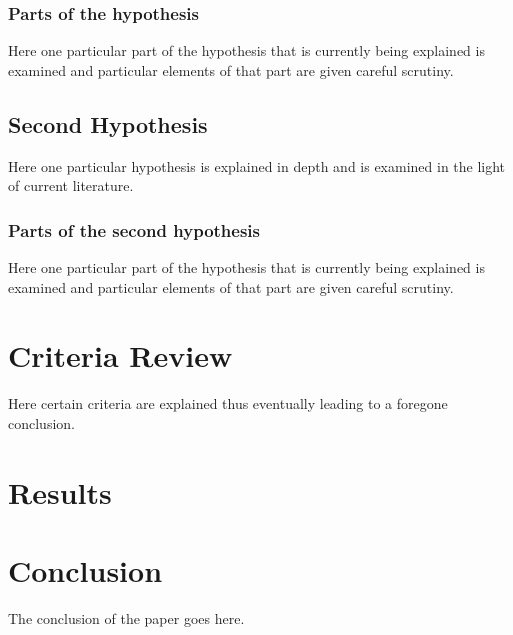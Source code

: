 \subsubsection{Parts of the hypothesis}

Here one particular part of the hypothesis that is
currently being explained is examined and particular
elements of that part are given careful scrutiny.


\subsection{Second Hypothesis}

Here one particular hypothesis is explained in depth
and is examined in the light of current literature.

\subsubsection{Parts of the second hypothesis}

Here one particular part of the hypothesis that is
currently being explained is examined and particular
elements of that part are given careful scrutiny.

\section{Criteria Review}

Here certain criteria are explained thus eventually
leading to a foregone conclusion.

\section{Results}

\section{Conclusion}\label{conclusion3}

The conclusion of the paper goes here.


